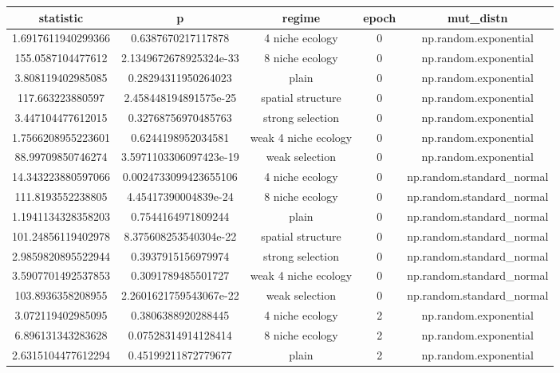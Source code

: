   \begin{longtable}{||c c c c c||}\small
    \centering
   statistic & p & regime & epoch & mut\_distn \\  [0.5ex]
     \hline
        1.6917611940299366 & 0.6387670217117878 & 4 niche ecology & 0 & np.random.exponential \\ 
        155.0587104477612 & 2.1349672678925324e-33 & 8 niche ecology & 0 & np.random.exponential \\ 
        3.808119402985085 & 0.28294311950264023 & plain & 0 & np.random.exponential \\ 
        117.663223880597 & 2.458448194891575e-25 & spatial structure & 0 & np.random.exponential \\ 
        3.447104477612015 & 0.32768756970485763 & strong selection & 0 & np.random.exponential \\ 
        1.7566208955223601 & 0.6244198952034581 & weak 4 niche ecology & 0 & np.random.exponential \\ 
        88.99709850746274 & 3.5971103306097423e-19 & weak selection & 0 & np.random.exponential \\ 
        14.343223880597066 & 0.0024733099423655106 & 4 niche ecology & 0 & np.random.standard\_normal \\ 
        111.8193552238805 & 4.45417390004839e-24 & 8 niche ecology & 0 & np.random.standard\_normal \\ 
        1.1941134328358203 & 0.7544164971809244 & plain & 0 & np.random.standard\_normal \\ 
        101.24856119402978 & 8.375608253540304e-22 & spatial structure & 0 & np.random.standard\_normal \\ 
        2.9859820895522944 & 0.3937915156979974 & strong selection & 0 & np.random.standard\_normal \\ 
        3.5907701492537853 & 0.3091789485501727 & weak 4 niche ecology & 0 & np.random.standard\_normal \\ 
        103.8936358208955 & 2.2601621759543067e-22 & weak selection & 0 & np.random.standard\_normal \\ 
        3.072119402985095 & 0.3806388920288445 & 4 niche ecology & 2 & np.random.exponential \\ 
        6.896131343283628 & 0.07528314914128414 & 8 niche ecology & 2 & np.random.exponential \\ 
        2.6315104477612294 & 0.45199211872779677 & plain & 2 & np.random.exponential \\ 

\end{longtable}
